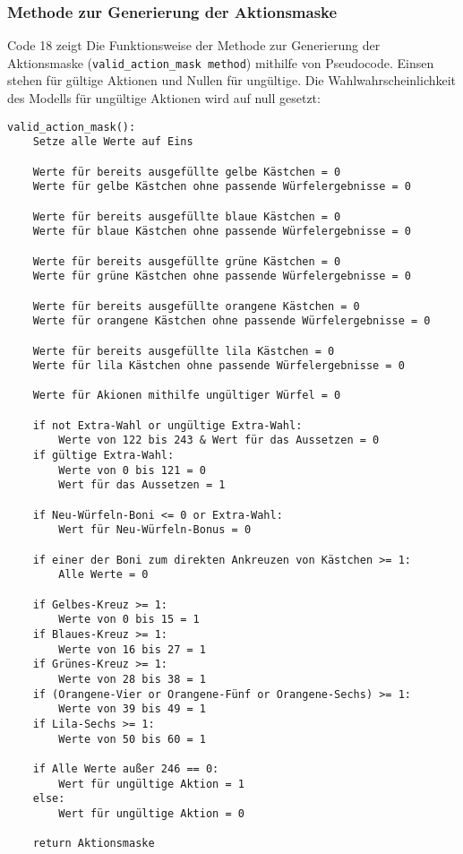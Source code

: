 \subsubsection{Methode zur Generierung der Aktionsmaske}
Code 18 zeigt Die Funktionsweise der Methode zur Generierung der Aktionsmaske (\texttt{valid\_action\_mask method}) mithilfe von Pseudocode. Einsen stehen für gültige Aktionen und Nullen für ungültige. Die Wahlwahrscheinlichkeit des Modells für ungültige Aktionen wird auf null gesetzt:
\vspace{0.5cm}
\begin{lstlisting}[caption={Methode zur Generierung der Aktionsmaske}]
valid_action_mask():
	Setze alle Werte auf Eins
	
	Werte für bereits ausgefüllte gelbe Kästchen = 0
	Werte für gelbe Kästchen ohne passende Würfelergebnisse = 0
	
	Werte für bereits ausgefüllte blaue Kästchen = 0
	Werte für blaue Kästchen ohne passende Würfelergebnisse = 0
	
	Werte für bereits ausgefüllte grüne Kästchen = 0
	Werte für grüne Kästchen ohne passende Würfelergebnisse = 0
	
	Werte für bereits ausgefüllte orangene Kästchen = 0
	Werte für orangene Kästchen ohne passende Würfelergebnisse = 0
	
	Werte für bereits ausgefüllte lila Kästchen = 0
	Werte für lila Kästchen ohne passende Würfelergebnisse = 0
	
	Werte für Akionen mithilfe ungültiger Würfel = 0
	
	if not Extra-Wahl or ungültige Extra-Wahl:
		Werte von 122 bis 243 & Wert für das Aussetzen = 0
	if gültige Extra-Wahl:
		Werte von 0 bis 121 = 0
		Wert für das Aussetzen = 1
	
	if Neu-Würfeln-Boni <= 0 or Extra-Wahl:
		Wert für Neu-Würfeln-Bonus = 0
	
	if einer der Boni zum direkten Ankreuzen von Kästchen >= 1:
		Alle Werte = 0
	
	if Gelbes-Kreuz >= 1:
		Werte von 0 bis 15 = 1
	if Blaues-Kreuz >= 1:
		Werte von 16 bis 27 = 1
	if Grünes-Kreuz >= 1:
		Werte von 28 bis 38 = 1
	if (Orangene-Vier or Orangene-Fünf or Orangene-Sechs) >= 1:
		Werte von 39 bis 49 = 1
	if Lila-Sechs >= 1:
		Werte von 50 bis 60 = 1
	
	if Alle Werte außer 246 == 0:
		Wert für ungültige Aktion = 1
	else:
		Wert für ungültige Aktion = 0
		
	return Aktionsmaske
\end{lstlisting}
